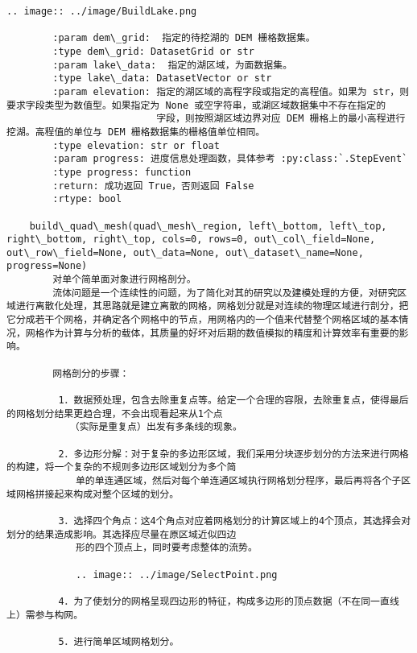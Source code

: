 \documentclass[11pt]{article}
\begin{document}
\begin{Verbatim}[commandchars=\\\{\}]
        .. image:: ../image/BuildLake.png
        
        :param dem\_grid:  指定的待挖湖的 DEM 栅格数据集。
        :type dem\_grid: DatasetGrid or str
        :param lake\_data:  指定的湖区域，为面数据集。
        :type lake\_data: DatasetVector or str
        :param elevation: 指定的湖区域的高程字段或指定的高程值。如果为 str，则要求字段类型为数值型。如果指定为 None 或空字符串，或湖区域数据集中不存在指定的
                          字段，则按照湖区域边界对应 DEM 栅格上的最小高程进行挖湖。高程值的单位与 DEM 栅格数据集的栅格值单位相同。
        :type elevation: str or float
        :param progress: 进度信息处理函数，具体参考 :py:class:`.StepEvent`
        :type progress: function
        :return: 成功返回 True，否则返回 False
        :rtype: bool
    
    build\_quad\_mesh(quad\_mesh\_region, left\_bottom, left\_top, right\_bottom, right\_top, cols=0, rows=0, out\_col\_field=None, out\_row\_field=None, out\_data=None, out\_dataset\_name=None, progress=None)
        对单个简单面对象进行网格剖分。
        流体问题是一个连续性的问题，为了简化对其的研究以及建模处理的方便，对研究区域进行离散化处理，其思路就是建立离散的网格，网格划分就是对连续的物理区域进行剖分，把它分成若干个网格，并确定各个网格中的节点，用网格内的一个值来代替整个网格区域的基本情况，网格作为计算与分析的载体，其质量的好坏对后期的数值模拟的精度和计算效率有重要的影响。
        
        网格剖分的步骤：
        
         1．数据预处理，包含去除重复点等。给定一个合理的容限，去除重复点，使得最后的网格划分结果更趋合理，不会出现看起来从1个点
           （实际是重复点）出发有多条线的现象。
        
         2．多边形分解：对于复杂的多边形区域，我们采用分块逐步划分的方法来进行网格的构建，将一个复杂的不规则多边形区域划分为多个简
            单的单连通区域，然后对每个单连通区域执行网格划分程序，最后再将各个子区域网格拼接起来构成对整个区域的划分。
        
         3．选择四个角点：这4个角点对应着网格划分的计算区域上的4个顶点，其选择会对划分的结果造成影响。其选择应尽量在原区域近似四边
            形的四个顶点上，同时要考虑整体的流势。
        
            .. image:: ../image/SelectPoint.png
        
         4．为了使划分的网格呈现四边形的特征，构成多边形的顶点数据（不在同一直线上）需参与构网。
        
         5．进行简单区域网格划分。
        

\end{Verbatim}
\end{document}
